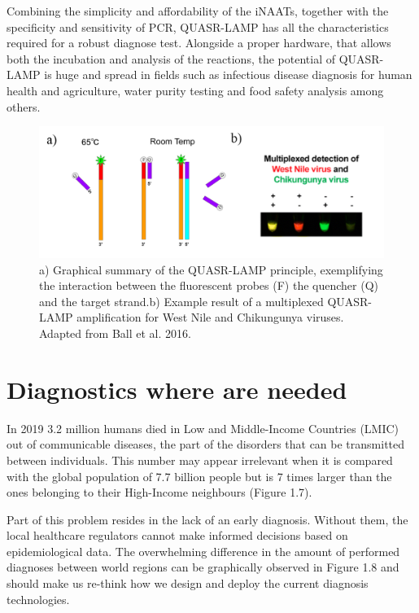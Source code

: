 Combining the simplicity and affordability of the iNAATs, together with the specificity and sensitivity of PCR, QUASR-LAMP has all the characteristics required for a robust diagnose test. Alongside a proper hardware, that allows both the incubation and analysis of the reactions, the potential of QUASR-LAMP is huge and spread in fields such as infectious disease diagnosis for human health and agriculture, water purity testing and food safety analysis among others.

\begin{figure}[h]
    \centering
    \includegraphics[width=1\textwidth]{figures/QUASR.JPG}
    \caption[Graphical summary of the QUASR-LAMP principle]{a) Graphical summary of the QUASR-LAMP principle, exemplifying the interaction between the fluorescent probes (F) the quencher (Q) and the target strand.b) Example result of a multiplexed QUASR-LAMP amplification for West Nile and Chikungunya viruses. Adapted from Ball et al. 2016\cite{ball_quenching_2016}.}
    \label{fig:QUASR}
\end{figure}

\newpage
\section{Diagnostics where are needed}
In 2019 3.2 million humans died in Low and Middle-Income Countries (LMIC) out of communicable diseases\cite{institute_for_health_metrics_and_evaluation_ihme_uniersity_of_washington_gbd_2015}, the part of the disorders that can be transmitted between individuals. This number may appear irrelevant when it is compared with the global population of 7.7 billion people\cite{worldometer_worldometer_2022} but is 7 times larger than the ones belonging to their High-Income neighbours (Figure 1.7). 

Part of this problem resides in the lack of an early diagnosis. Without them, the local healthcare regulators cannot make informed decisions based on epidemiological data. The overwhelming difference in the amount of performed diagnoses between world regions can be graphically observed in Figure 1.8 and should make us re-think how we design and deploy the current diagnosis technologies. 

